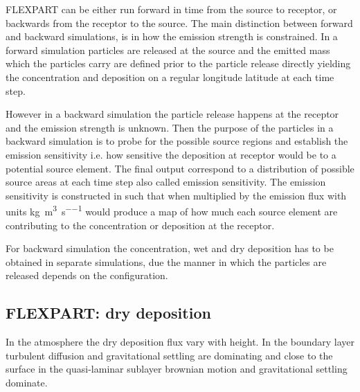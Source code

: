 FLEXPART can be either run forward in time from the source to receptor, or backwards from the receptor to the source. The main distinction between forward and backward simulations, is in how the emission strength is constrained. In a forward simulation particles are released at the source and the emitted mass which the particles carry are defined prior to the particle release directly yielding the concentration and deposition on a regular longitude latitude at each time step. 

However in a backward simulation the particle release happens at the receptor and the emission strength is unknown. Then the purpose of the particles in a backward simulation is to probe for the possible source regions and establish the emission sensitivity i.e. how sensitive the deposition at receptor would be to a potential source element. The final output correspond to a distribution of possible source areas at each time step also called emission sensitivity. The emission sensitivity is constructed in such that when multiplied by the emission flux with units \si{\kg\per\cubic\metre\per\s} would produce a map of how much each source element are contributing to the concentration or deposition at the receptor.  

For backward simulation the concentration, wet and dry deposition has to be obtained in separate simulations, due  the manner in which the particles are released depends on the configuration.  
\subsection{FLEXPART: dry deposition}
In the atmosphere the dry deposition flux vary with height. In the boundary layer turbulent diffusion and gravitational settling are dominating and close to the surface in the quasi-laminar sublayer brownian motion and gravitational settling dominate. 

